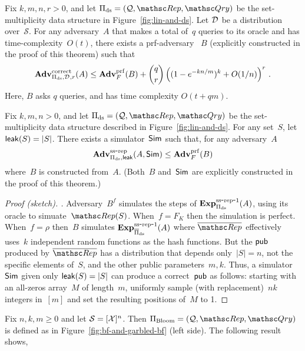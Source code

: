 \begin{theorem}\label{thm2}\label{thm:ds-correctness}
Fix $k,m,n,r>0$, and let $\Pi_{\mathrm{ds}}= (\calQ,\Rep, \Qry)$ be the set-multiplicity data structure in Figure~\ref{fig:lin-and-ds}. Let $\mathcal{D}_{}^{}$ be a distribution over~$\mathcal{S}$.  For any adversary~$A$ that makes a total of~$q$ queries to its oracle and has time-complexity~$O(t)$, there exists a prf-adversary ~$B$ (explicitly constructed in the proof of this theorem) such that
\[
\mathrm{\mathbf{Adv}}^{\mathrm{correct}}_{\Pi_{\mathrm{ds}},\mathcal{D}_{}^{},r}(A) \leq  \mathbf{Adv}^{\mathrm{prf}}_{F}(B)  + {\dbinom{q}{r}} \left( (1-e^{-kn/m})^k + O(1/n) \right)^r\,.
\]
Here, $B$ asks $q$ queries, and has time complexity $O(t+qm)$.
\end{theorem}

\begin{theorem}\label{thm:ds-ss}
Fix $k,m,n>0$, and let $\Pi_{\mathrm{ds}}= (\calQ,\Rep, \Qry)$ be the set-multiplicity data structure described in Figure~\ref{fig:lin-and-ds}.  For any set~$S$, let ${\sf leak}(S)=|S|$.  There exists a simulator~${\sf Sim}$ such that, for any adversary~$A$
\[
\mathrm{\mathbf{Adv}}^{\mathrm{ss\mbox{-}rep}}_{\Pi_{\mathrm{ds}},{\sf leak}}(A,{\sf Sim}) \leq  \mathbf{Adv}^{\mathrm{prf}}_{F}(B)
\]
where~$B$ is constructed from~$A$.  (Both~$B$ and~${\sf Sim}$ are explicitly constructed in the proof of this theorem.)
\end{theorem}
\begin{proof}[Proof (sketch). ]
Adversary~$B^{f}$ simulates the steps of $\mathrm{\mathbf{Exp}}^{\mathrm{ss\mbox{-}rep\mbox{-}1}}_{\Pi_{\mathrm{ds}}}(A)$, using its oracle to simuate~$\Rep(S)$.  When~$f=F_K$ then the simulation is perfect.  When~$f=\rho$ then~$B$ simulates $\mathrm{\mathbf{Exp}}^{\mathrm{ss\mbox{-}rep\mbox{-}1}}_{\overline{\Pi}_{\mathrm{ds}}}(A)$ where $\overline{\Rep}$ effectively uses~$k$ independent random functions as the hash functions.  But the ${\sf pub}$ produced by $\overline{\Rep}$ has a distribution that depends only~$|S|=n$, not the specific elements of~$S$, and the other public parameters~$m,k$.  Thus, a simulator~${\sf Sim}$ given only ${\sf leak}(S)=|S|$ can produce a correct~${\sf pub}$ as follows: starting with an all-zeros array~$M$ of length~$m$, uniformly sample (with replacement)~$nk$ integers in~$[m]$ and set the resulting positions of~$M$ to 1.
\end{proof}


Fix $n,k,m \geq 0$ and let $\mathcal{S}=[{\cal X}]^n$.  Then $\Pi_{\mathrm{Bloom}}= (\calQ,\Rep, \Qry)$ is defined as in Figure~\ref{fig:bf-and-garbled-bf} (left side).  The following result shows,

